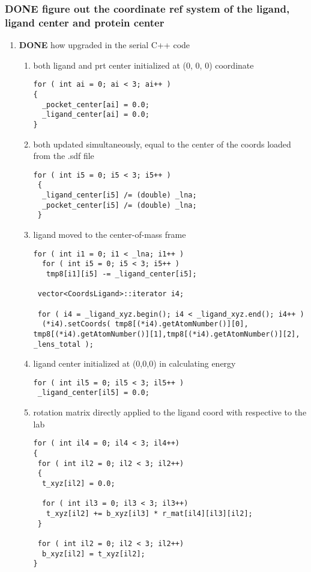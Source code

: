 \documentclass[11pt]{article}
\begin{document}
\subsubsection{{\bfseries\sffamily DONE} figure out the coordinate ref system of the ligand, ligand center and protein center}
\label{sec-2-2-3}
\begin{enumerate}
\item {\bfseries\sffamily DONE} how upgraded in the serial C++ code
\label{sec-2-2-3-1}
\begin{enumerate}
\item both ligand and prt center initialized at (0, 0, 0) coordinate
\label{sec-2-2-3-1-1}
\begin{verbatim}
for ( int ai = 0; ai < 3; ai++ )
{
  _pocket_center[ai] = 0.0;
  _ligand_center[ai] = 0.0;
}
\end{verbatim}

\item both updated simultaneously, equal to the center of the coords loaded from the .sdf file
\label{sec-2-2-3-1-2}
\begin{verbatim}
for ( int i5 = 0; i5 < 3; i5++ )
 {
  _ligand_center[i5] /= (double) _lna;
  _pocket_center[i5] /= (double) _lna;
 }
\end{verbatim}

\item ligand moved to the center-of-mass frame
\label{sec-2-2-3-1-3}
\begin{verbatim}
for ( int i1 = 0; i1 < _lna; i1++ )
  for ( int i5 = 0; i5 < 3; i5++ )
   tmp8[i1][i5] -= _ligand_center[i5];

 vector<CoordsLigand>::iterator i4;

 for ( i4 = _ligand_xyz.begin(); i4 < _ligand_xyz.end(); i4++ )
  (*i4).setCoords( tmp8[(*i4).getAtomNumber()][0], tmp8[(*i4).getAtomNumber()][1],tmp8[(*i4).getAtomNumber()][2], _lens_total );
\end{verbatim}

\item ligand center initialized at (0,0,0) in calculating energy
\label{sec-2-2-3-1-4}
\begin{verbatim}
for ( int il5 = 0; il5 < 3; il5++ )
 _ligand_center[il5] = 0.0;
\end{verbatim}

\item rotation matrix directly applied to the ligand coord with respective to the lab
\label{sec-2-2-3-1-5}
\begin{verbatim}
for ( int il4 = 0; il4 < 3; il4++)
{
 for ( int il2 = 0; il2 < 3; il2++)
 {
  t_xyz[il2] = 0.0;

  for ( int il3 = 0; il3 < 3; il3++)
   t_xyz[il2] += b_xyz[il3] * r_mat[il4][il3][il2];
 }

 for ( int il2 = 0; il2 < 3; il2++)
  b_xyz[il2] = t_xyz[il2];
}
\end{verbatim}
\end{enumerate}
\end{enumerate}
\end{document}
